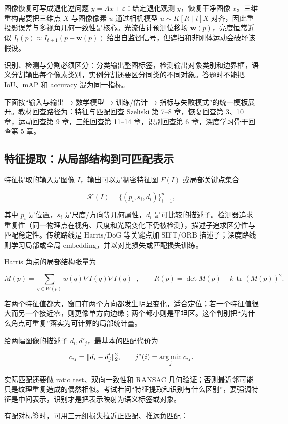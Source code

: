 图像恢复可写成退化逆问题 \(y=Ax+\varepsilon\)：给定退化观测 \(y\)，恢复干净图像 \(x\)。三维重构需要把三维点 \(X\) 与图像像素 \(u\) 通过相机模型 \(u\sim K[R\mid t]X\) 对齐，因此重投影误差与多视角几何一致性是核心。光流估计预测位移场 \(\mathbf w(p)\)，亮度恒常近似 \(I_t(p)\approx I_{t+1}(p+\mathbf w(p))\) 给出自监督信号，但遮挡和非刚体运动会破坏该假设。

识别、检测与分割必须区分：分类输出整图标签，检测输出对象类别和边界框，语义分割输出每个像素类别，实例分割还要区分同类的不同对象。答题时不能把 IoU、mAP 和 accuracy 混为同一指标。

下面按“输入与输出 → 数学模型 → 训练/估计 → 指标与失败模式”的统一模板展开。教材回查路径为：特征与匹配回查 Szeliski 第 7--8 章，恢复回查第 3、10 章，运动回查第 9 章，三维回查第 11--14 章，识别回查第 6 章，深度学习骨干回查第 5 章。

\subsection{特征提取：从局部结构到可匹配表示}

特征提取的输入是图像 \(I\)，输出可以是稠密特征图 \(F(I)\) 或局部关键点集合

\[
  \mathcal{K}(I)=\{(p_i,s_i,d_i)\}_{i=1}^{n},
\]

其中 \(p_i\) 是位置，\(s_i\) 是尺度/方向等几何属性，\(d_i\) 是可比较的描述子。检测器追求重复性（同一物理点在视角、尺度和光照变化下仍被检测），描述子追求区分性与匹配稳定性。传统路线是 Harris/DoG 等关键点加 SIFT/ORB 描述子；深度路线则学习局部或全局 embedding，并以对比损失或匹配损失训练。

Harris 角点的局部结构张量为

\[
  M(p)=\sum_{q\in W(p)} w(q)\nabla I(q)\nabla I(q)^\top,
  \qquad
  R(p)=\det M(p)-k\,\operatorname{tr}(M(p))^2.
\]

若两个特征值都大，窗口在两个方向都发生明显变化，适合定位；若一个特征值很大而另一个接近零，则更像单方向边缘；两个都小则是平坦区。这个判别把“为什么角点可重复”落实为可计算的局部统计量。

给两幅图像的描述子 \(d_i,d'_j\)，最基本的匹配代价为

\[
  c_{ij}=\|d_i-d'_j\|_2^2,
  \qquad
  j^*(i)=\operatorname*{arg\,min}_j c_{ij}.
\]

实际匹配还要做 ratio test、双向一致性和 RANSAC 几何验证；否则最近邻可能只是纹理重复造成的偶然相似。考试若问“特征提取和识别有什么区别”，要强调特征是中间表示，识别才是把表示映射为语义标签或对象。

有配对标签时，可用三元组损失拉近正匹配、推远负匹配：

